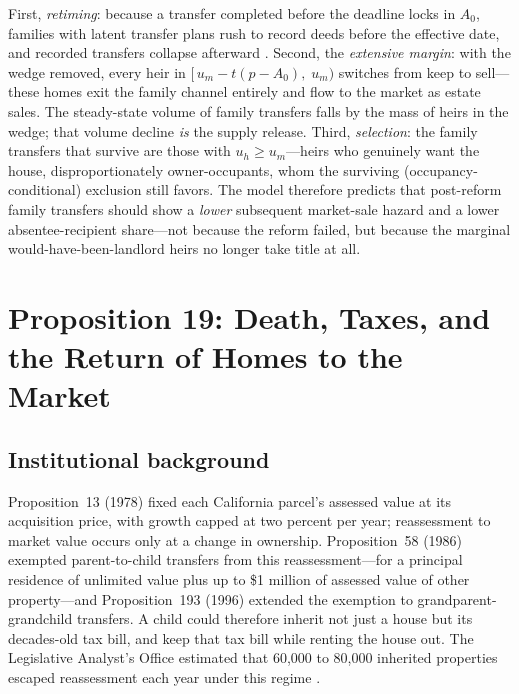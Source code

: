 \documentclass[12pt, letterpaper]{article}
\begin{document}
First, \emph{retiming}: because a transfer completed before the deadline
locks in $A_0$, families with latent transfer plans rush to record deeds
before the effective date, and recorded transfers collapse afterward
\citep[cf. the transaction-tax notch literature:][]{kopczukmunroe2015mansion,
slemrodwebershan2017dc, bestkleven2018notches}. Second, the \emph{extensive
margin}: with the wedge removed, every heir in
$[\,u_m - t(p - A_0),\; u_m)$ switches from keep to sell---these homes exit
the family channel entirely and flow to the market as estate sales. The
steady-state volume of family transfers falls by the mass of heirs in the
wedge; that volume decline \emph{is} the supply release. Third,
\emph{selection}: the family transfers that survive are those with
$u_h \ge u_m$---heirs who genuinely want the house, disproportionately
owner-occupants, whom the surviving (occupancy-conditional) exclusion still
favors. The model therefore predicts that post-reform family transfers should
show a \emph{lower} subsequent market-sale hazard and a lower
absentee-recipient share---not because the reform failed, but because the
marginal would-have-been-landlord heirs no longer take title at all.

\section{Proposition 19: Death, Taxes, and the Return of Homes to the Market}\label{sec:prop19}

\subsection{Institutional background}

Proposition~13 (1978) fixed each California parcel's assessed value at its
acquisition price, with growth capped at two percent per year; reassessment
to market value occurs only at a change in ownership. Proposition~58 (1986)
exempted parent-to-child transfers from this reassessment---for a principal
residence of unlimited value plus up to \$1 million of assessed value of
other property---and Proposition~193 (1996) extended the exemption to
grandparent-grandchild transfers. A child could therefore inherit not just a
house but its decades-old tax bill, and keep that tax bill while renting the
house out. The Legislative Analyst's Office estimated that 60,000 to 80,000
inherited properties escaped reassessment each year under this regime
\citep{lao2017inheritance}.
\end{document}
